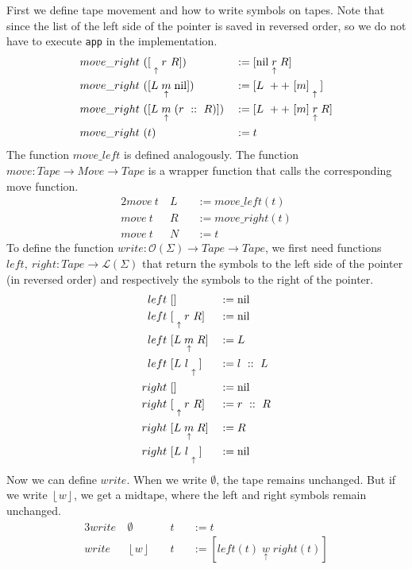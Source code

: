 \documentclass{psartcl}
\newcommand{\nil}{\M{nil}}
\newcommand{\cons}{~ :: ~}
\newcommand{\app}{~ ++ ~}
\newcommand{\from}{:}
\renewcommand{\to}{\rightarrow}
\newcommand{\Opt}{\mathcal{O}}
\newcommand{\List}{\mathcal{L}}
\newcommand{\Some}[1]{\left\lfloor #1\right\rfloor}
\renewcommand{\None}{\emptyset}
\newcommand{\tape}[1]{[ #1 ]}
\newcommand{\tapePointer}[1]{\; \underset{\uparrow}{#1} \;}
\newcommand{\txt}[1]{\text{#1}}
\begin{document}
First we define tape movement and how to write symbols on tapes.  Note that since the list of the left side of the pointer is saved in reversed order,
so we do not have to execute \texttt{app} in the implementation.
\begin{alignat*}{2}
  move\_right&~(\tape{\tapePointer{} r~R})            &&:= \tape{\nil \tapePointer{r} R} \\
  move\_right&~(\tape{L \tapePointer{m} \nil       }) &&:= \tape{L \app [m] \tapePointer{}} \\
  move\_right&~(\tape{L \tapePointer{m} (r \cons R)}) &&:= \tape{L \app [m] \tapePointer{r} R} \\
  move\_right&~(t)                                    &&:= t
\end{alignat*}
The function $move\_left$ is defined analogously.  The function $move \from Tape \to Move \to Tape$ is a wrapper function that calls the corresponding
move function.
\begin{alignat*}{2}
  move~t&~L &&:= move\_left(t) \\
  move~t&~R &&:= move\_right(t) \\
  move~t&~N &&:= t
\end{alignat*}
To define the function $write \from \Opt(\Sigma) \to Tape \to Tape$, we first need functions $left,~right \from Tape \to \List(\Sigma)$ that return
the symbols to the left side of the pointer (in reversed order) and respectively the symbols to the right of the pointer.
\begin{alignat*}{2}
  left&~\tape{}                   &&:= \nil \\
  left&~\tape{\tapePointer{} r~R}    &&:= \nil \\
  left&~\tape{L \tapePointer{m} R}   &&:= L \\
  left&~\tape{L~l \tapePointer{}}    &&:= l \cons L \\
  right&~\tape{}                  &&:= \nil \\
  right&~\tape{\tapePointer{} r~R}   &&:= r \cons R \\
  right&~\tape{L \tapePointer{m} R}  &&:= R \\
  right&~\tape{L~l \tapePointer{}}   &&:= \nil
\end{alignat*}
Now we can define $write$.  When we write $\None$, the tape remains unchanged.  But if we write $\Some w$, we get a $\txt{midtape}$, where the left
and right symbols remain unchanged.
\begin{alignat*}{3}
  write~&\None   &&~ t &&:= t \\
  write~&\Some w &&~ t &&:= \tape{left(t) \tapePointer{w} right(t)}
\end{alignat*}
\end{document}
